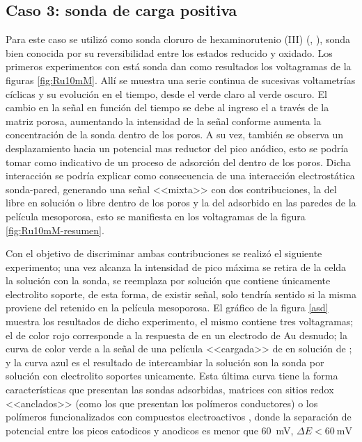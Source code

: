 	\subsection{Caso 3: sonda de carga positiva}

		Para este caso se utilizó como sonda cloruro de hexaminorutenio (III) (\aminorutenioCompleto, \ru), sonda bien conocida por su reversibilidad entre los estados reducido y oxidado. Los primeros experimentos con está sonda dan como resultados los voltagramas de la figuras \ref{fig:Ru10mM}. Allí se muestra una serie continua de sucesivas voltametrías cíclicas y su evolución en el tiempo, desde el verde claro al verde oscuro. El cambio en la señal en función del tiempo se debe al ingreso el \ru\space a través de la matriz porosa, aumentando la intensidad de la señal conforme aumenta la concentración de la sonda dentro de los poros. A su vez, también se observa un desplazamiento hacia un potencial mas reductor del pico anódico, esto se podría tomar como indicativo de un proceso de adsorción del \ru\space dentro de los poros. Dicha interacción se podría explicar como consecuencia de una interacción electrostática sonda-pared, generando una señal <<mixta>> con dos contribuciones, la del \ru\space libre en solución o libre dentro de los poros y la del adsorbido en las paredes de la película mesoporosa, esto se manifiesta en los voltagramas de la figura \ref{fig:Ru10mM-resumen}.

		Con el objetivo de discriminar ambas contribuciones se realizó el siguiente experimento; una vez alcanza la intensidad de pico máxima se retira de la celda la solución con la sonda, se reemplaza por solución que contiene únicamente electrolito soporte, de esta forma, de existir señal, solo tendría sentido si la misma proviene del \ru\space retenido en la película mesoporosa. El gráfico de la figura \ref{asd} muestra los resultados de dicho experimento, el mismo contiene tres voltagramas; el de color rojo corresponde a la respuesta de \ru\space en un electrodo de Au desnudo; la curva de color verde a la señal de una película <<cargada>> de \ru\space en solución de \ru; y la curva azul es el resultado de intercambiar la solución son la sonda por solución con electrolito soportes unicamente. Esta última curva tiene la forma características que presentan las sondas adsorbidas, matrices con sitios redox <<anclados>>\cite{Ybarra2005} (como los que presentan los polímeros conductores) o los polímeros funcionalizados con compuestos electroactivos \cite{Rohlfing2005,Vila2015}, donde la separación de potencial entre los picos catodicos y anodicos es menor que \SI{60}{\milli\volt}, $\Delta E < \SI{60}{\milli\volt}$ 

